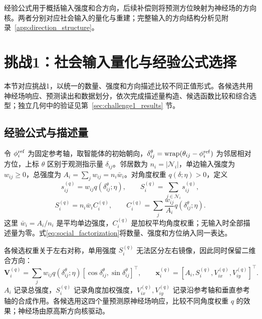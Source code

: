 \documentclass[UTF8,fontset=windows,11pt]{ctexart}
\begin{document}
经验公式用于概括输入强度和合方向，后续补偿则将预测方位映射为神经场的方向核。两者分别对应社会输入的量化与重建；完整输入的方向结构分析见附录~\ref{app:direction_structure}。


\FloatBarrier
\section{挑战1：社会输入量化与经验公式选择}
\label{sec:social_input_model}

本节对应挑战1，以统一的数量、强度和方向描述比较不同正值形式。各候选共用神经场响应、预测读出和数据划分，依次完成描述量构造、候选函数比较和综合选型；独立几何中的验证见第~\ref{sec:challenge1_results} 节。

\subsection{经验公式与描述量}
令 $\phi_i^{\rm ref}$ 为固定参考轴，取智能体的初始朝向，$\delta^\theta_{ij}=\operatorname{wrap}(\theta_{ij}-\phi_i^{\rm ref})$ 为邻居相对方位，上标 $\theta$ 区别于观测指示量 $\delta_{ij}$。邻居数为 $n_i=|\mathcal N_i|$，单边输入强度为 $w_{ij}\ge0$，总强度为 $A_i=\sum_jw_{ij}=n_i\bar w_i$。对角度权重 $q(\delta;\eta)>0$，定义
\begin{equation}
 s_{ij}^{(q)}=w_{ij}q(\delta^\theta_{ij};\eta),\qquad
 S_i^{(q)}=\sum_{j\in\mathcal N_i}s_{ij}^{(q)},
 \label{eq:total_social_input}
\end{equation}
\begin{equation}
 S_i^{(q)}=n_i\bar w_i C_i^{(q)},\qquad
 C_i^{(q)}=\sum_j\frac{w_{ij}}{A_i}q(\delta^\theta_{ij};\eta).
 \label{eq:social_factorization}
\end{equation}
这里 $\bar w_i=A_i/n_i$ 是平均单边强度，$C_i^{(q)}$ 是加权平均角度权重；无输入时全部描述量为零。式\eqref{eq:social_factorization}将数量、强度和方位纳入同一表达。

各候选权重关于左右对称，单用强度 $S_i^{(q)}$ 无法区分左右镜像，因此同时保留二维合方向：
\begin{equation}
 \boldsymbol V_i^{(q)}=\sum_jw_{ij}q(\delta^\theta_{ij};\eta)
 [\cos\delta^\theta_{ij},\sin\delta^\theta_{ij}]^\top,\qquad
 \boldsymbol x_i^{(q)}=[A_i,S_i^{(q)},V_{ix}^{(q)},V_{iy}^{(q)}]^\top.
 \label{eq:empirical_descriptor}
\end{equation}
$A_i$ 记录总强度，$S_i^{(q)}$ 记录角度加权强度，$V_{ix}^{(q)},V_{iy}^{(q)}$ 记录沿参考轴和垂直参考轴的合成作用。各候选用这四个量预测原神经场响应，比较不同角度权重 $q$ 的效果；神经场由原高斯方向核驱动。
\end{document}
